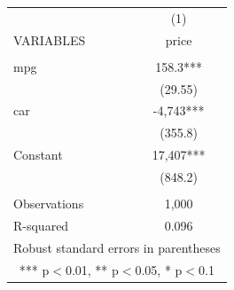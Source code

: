 \begin{tabular}{lc} \hline
 & (1) \\
VARIABLES & price \\ \hline
 &  \\
mpg & 158.3*** \\
 & (29.55) \\
car & -4,743*** \\
 & (355.8) \\
Constant & 17,407*** \\
 & (848.2) \\
 &  \\
Observations & 1,000 \\
 R-squared & 0.096 \\ \hline
\multicolumn{2}{c}{ Robust standard errors in parentheses} \\
\multicolumn{2}{c}{ *** p$<$0.01, ** p$<$0.05, * p$<$0.1} \\
\end{tabular}
